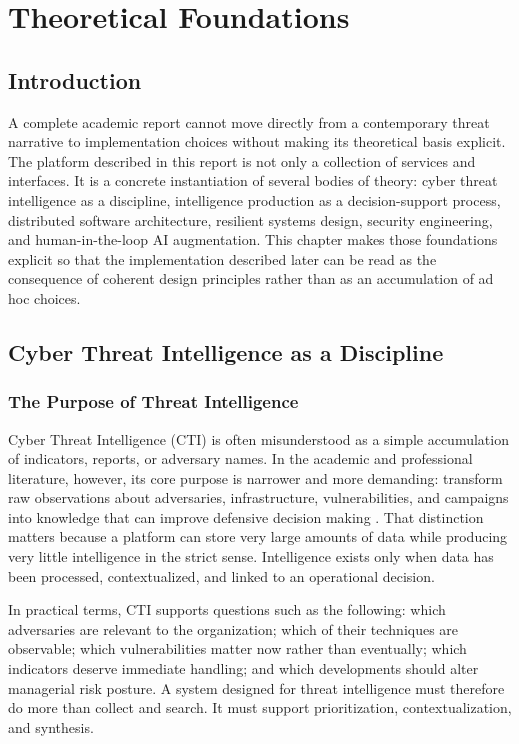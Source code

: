 \chapter{Theoretical Foundations}
\thispagestyle{plain}
\section*{Introduction}
A complete academic report cannot move directly from a contemporary threat narrative to implementation choices without making its theoretical basis explicit. The platform described in this report is not only a collection of services and interfaces. It is a concrete instantiation of several bodies of theory: cyber threat intelligence as a discipline, intelligence production as a decision-support process, distributed software architecture, resilient systems design, security engineering, and human-in-the-loop AI augmentation. This chapter makes those foundations explicit so that the implementation described later can be read as the consequence of coherent design principles rather than as an accumulation of ad hoc choices.

\section{Cyber Threat Intelligence as a Discipline}
\subsection{The Purpose of Threat Intelligence}
Cyber Threat Intelligence (CTI) is often misunderstood as a simple accumulation of indicators, reports, or adversary names. In the academic and professional literature, however, its core purpose is narrower and more demanding: transform raw observations about adversaries, infrastructure, vulnerabilities, and campaigns into knowledge that can improve defensive decision making \cite{nist_cti_guide}. That distinction matters because a platform can store very large amounts of data while producing very little intelligence in the strict sense. Intelligence exists only when data has been processed, contextualized, and linked to an operational decision.

In practical terms, CTI supports questions such as the following: which adversaries are relevant to the organization; which of their techniques are observable; which vulnerabilities matter now rather than eventually; which indicators deserve immediate handling; and which developments should alter managerial risk posture. A system designed for threat intelligence must therefore do more than collect and search. It must support prioritization, contextualization, and synthesis.

